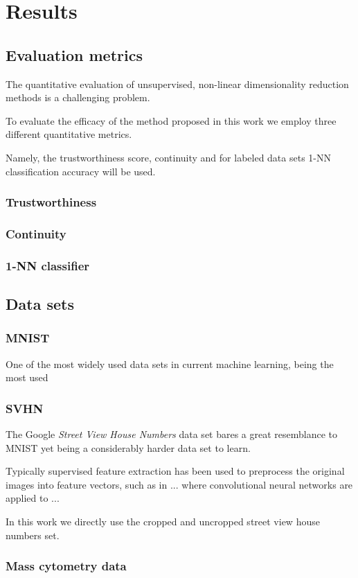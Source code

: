 \chapter{Results}
\label{ch:results}

\section{Evaluation metrics}

The quantitative evaluation of unsupervised, non-linear dimensionality reduction methods is a challenging problem.

To evaluate the efficacy of the method proposed in this work we employ three different quantitative metrics.

Namely, the trustworthiness score, continuity and for labeled data sets 1-NN classification accuracy will be used.

\subsection{Trustworthiness}

\subsection{Continuity}

\subsection{1-NN classifier}

\section{Data sets}

\subsection{MNIST}

One of the most widely used data sets in current machine learning, being the most used 

\subsection{SVHN}

The Google \textit{Street View House Numbers} data set bares a great resemblance to MNIST yet being a considerably harder data set to learn.

Typically supervised feature extraction has been used to preprocess the original images into feature vectors, such as in ... where convolutional neural networks are applied to ...

In this work we directly use the cropped and uncropped street view house numbers set.

\subsection{Mass cytometry data}


